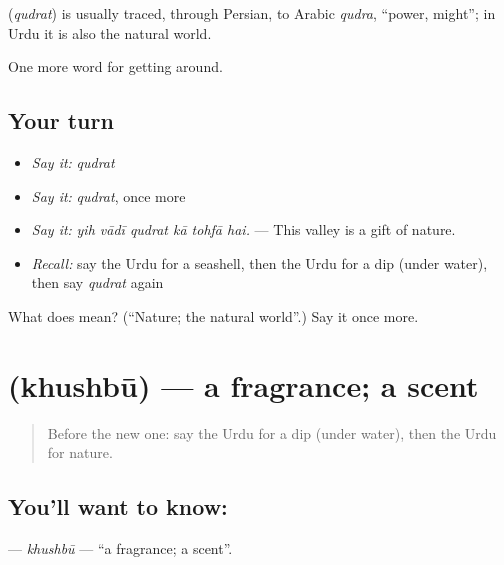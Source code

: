 \begin{cousinweb}
\textbf{} (\emph{qudrat}) is usually traced, through Persian, to Arabic \emph{qudra}, \textquotedblleft{}power, might\textquotedblright{}; in Urdu it is also the natural world.
\end{cousinweb}

\begin{grammarlens}[title={What you've built}]
One more word for getting around.
\end{grammarlens}

\subsection*{Your turn}
\begin{itemize}
\raggedright
  \item \emph{Say it:} \emph{qudrat}
  \item \emph{Say it:} \emph{qudrat}, once more
  \item \emph{Say it:} \emph{yih vādī qudrat kā tohfā hai.} — This valley is a gift of nature.
  \item \emph{Recall:} say the Urdu for a seashell, then the Urdu for a dip (under water), then say \emph{qudrat} again
\end{itemize}

\begin{tcolorbox}[breakable,colback=teal!4,colframe=teal!35!black,title={Before you move on}]
What does  mean? (\textquotedblleft{}Nature; the natural world\textquotedblright{}.) Say it once more.
\end{tcolorbox}
\section[\texorpdfstring{\ur{خوشبو} (khushbū)}{خوشبو (khushbū)}]{ (khushbū) — a fragrance; a scent}

\label{lesson:UR-C436-khushbu}



\begin{quote}
Before the new one: say the Urdu for a dip (under water), then the Urdu for nature.
\end{quote}

\subsection*{You'll want to know: }
\textbf{} — \emph{khushbū} — \textquotedblleft{}a fragrance; a scent\textquotedblright{}.

